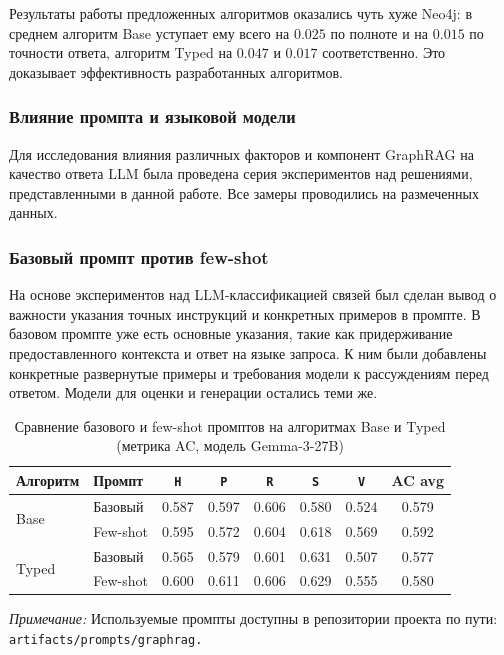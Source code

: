 Результаты работы предложенных алгоритмов оказались чуть хуже
Neo4j: в среднем алгоритм Base уступает ему всего на $0.025$ по полноте и на $0.015$
по точности ответа, алгоритм Typed на $0.047$ и $0.017$  соответственно.
Это доказывает эффективность разработанных алгоритмов.

\subsubsection{Влияние промпта и языковой модели}
\label{sec:llm_prompt_effect}

Для исследования влияния различных факторов и компонент GraphRAG на качество ответа LLM
была проведена серия экспериментов над решениями, представленными в данной работе.
Все замеры проводились на размеченных данных.

\subsubsection*{Базовый промпт против few-shot}
На основе экспериментов над LLM-классификацией связей был сделан вывод о важности
указания точных инструкций и конкретных примеров в промпте.
В базовом промпте уже есть основные указания,
такие как придерживание предоставленного контекста и ответ на языке запроса.
К ним были добавлены конкретные развернутые примеры и
требования модели к рассуждениям перед ответом.
Модели для оценки и генерации остались теми же.

\begin{table}[H]
    \caption{Сравнение базового и few-shot промптов на алгоритмах Base и Typed (метрика AC, модель Gemma-3-27B)}
    \label{tab:prompt_effect_full_versus}
    \centering
    \begin{tabular}{llcccccc}
        \hline
        \textbf{Алгоритм}      & \textbf{Промпт} & \texttt{H} & \texttt{P} & \texttt{R} & \texttt{S} & \texttt{V} & \textbf{AC avg} \\
        \hline
        \multirow{2}{*}{Base}  & Базовый         & 0.587      & 0.597      & 0.606      & 0.580      & 0.524      & 0.579           \\
                               & Few-shot        & 0.595      & 0.572      & 0.604      & 0.618      & 0.569      & 0.592           \\
        \hline
        \multirow{2}{*}{Typed} & Базовый         & 0.565      & 0.579      & 0.601      & 0.631      & 0.507      & 0.577           \\
                               & Few-shot        & 0.600      & 0.611      & 0.606      & 0.629      & 0.555      & 0.580           \\
        \hline
    \end{tabular}

    \vspace{1ex}
    \raggedright\footnotesize
    \textit{Примечание:} Используемые промпты
    доступны в репозитории проекта по пути: \texttt{artifacts/prompts/graphrag.} \\
\end{table}

